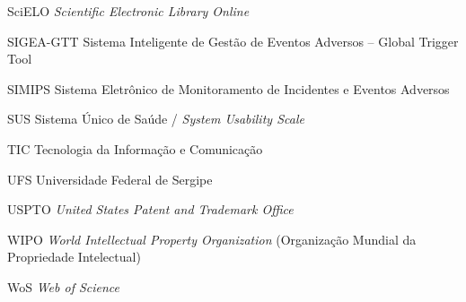 \begin{siglas}
    \item[SciELO] \textit{Scientific Electronic Library Online}
    \item[SIGEA-GTT] Sistema Inteligente de Gestão de Eventos Adversos -- Global Trigger Tool
    \item[SIMIPS] Sistema Eletrônico de Monitoramento de Incidentes e Eventos Adversos
    \item[SUS] Sistema Único de Saúde / \textit{System Usability Scale}
    \item[TIC] Tecnologia da Informação e Comunicação
    \item[UFS] Universidade Federal de Sergipe
    \item[USPTO] \textit{United States Patent and Trademark Office}
    \item[WIPO] \textit{World Intellectual Property Organization} (Organização Mundial da Propriedade Intelectual)
    \item[WoS] \textit{Web of Science}
\end{siglas}
